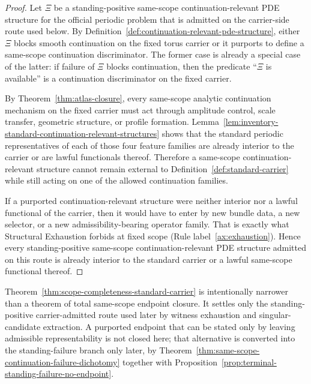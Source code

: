 \begin{proof}
Let $\Xi$ be a standing-positive same-scope continuation-relevant PDE structure for the official periodic problem that is admitted on the carrier-side route used below.
By Definition~\ref{def:continuation-relevant-pde-structure}, either $\Xi$ blocks smooth continuation
on the fixed torus carrier or it purports to define a same-scope continuation discriminator. The
former case is already a special case of the latter: if failure of $\Xi$ blocks continuation, then the
predicate ``$\Xi$ is available'' is a continuation discriminator on the fixed carrier.

By Theorem~\ref{thm:atlas-closure}, every same-scope analytic continuation mechanism on the fixed
carrier must act through amplitude control, scale transfer, geometric structure, or profile
formation. Lemma~\ref{lem:inventory-standard-continuation-relevant-structures} shows that the
standard periodic representatives of each of those four feature families are already interior to the
carrier or are lawful functionals thereof. Therefore a same-scope continuation-relevant structure
cannot remain external to Definition~\ref{def:standard-carrier} while still acting on one of the
allowed continuation families.

If a purported continuation-relevant structure were neither interior nor a lawful functional of the
carrier, then it would have to enter by new bundle data, a new selector, or a new admissibility-bearing
operator family. That is exactly what Structural Exhaustion forbids at fixed scope
(Rule label~\ref{ax:exhaustion}). Hence every standing-positive same-scope continuation-relevant PDE structure admitted on this route is already interior to the standard carrier or a lawful same-scope functional thereof.
\end{proof}

\begin{remark}\label{rem:scope-completeness-half-endgame}
Theorem~\ref{thm:scope-completeness-standard-carrier} is intentionally narrower than a theorem of total same-scope endpoint closure. It settles only the standing-positive carrier-admitted route used later by witness exhaustion and singular-candidate extraction. A purported endpoint that can be stated only by leaving admissible representability is not closed here; that alternative is converted into the standing-failure branch only later, by Theorem~\ref{thm:same-scope-continuation-failure-dichotomy} together with Proposition~\ref{prop:terminal-standing-failure-no-endpoint}.
\end{remark}

